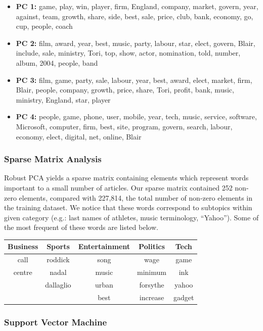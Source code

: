 \documentclass[12pt]{article}
\begin{document}
\begin{itemize}
\item {\bf PC 1:} game, play, win, player, firm, England, company, market, govern, year, against, team, growth, share, side, best, sale, price, club, bank, economy, go, cup, people, coach
\item {\bf PC 2:} film, award, year, best, music, party, labour, star, elect, govern, Blair, include, sale, ministry, Tori, top, show, actor, nomination, told, number, album, 2004, people, band
\item {\bf PC 3:}  film, game, party, sale, labour, year, best, award, elect, market, firm, Blair, people, company, growth, price, share, Tori, profit, bank, music, ministry, England, star, player
\item {\bf PC 4:} people, game, phone, user, mobile, year, tech, music, service, software, Microsoft, computer, firm, best, site, program, govern, search, labour, economy, elect, digital,
net, online, Blair
\end{itemize}

\subsubsection{Sparse Matrix Analysis}
Robust PCA yields a sparse matrix containing elements which represent words important to a small number of articles. Our sparse matrix contained 252 non-zero elements, compared with 227,814, the total number of non-zero elements in the training dataset. We notice that these words correspond to subtopics within given category (e.g.: last names of athletes, music terminology, “Yahoo”). Some of the most frequent of these words are listed below.

\begin{center}
\begin{tabular}{c c c c c}
{\bf Business} & {\bf Sports} & {\bf Entertainment} & {\bf Politics} & {\bf Tech} \\ \hline
call & roddick & song & wage & game \\
centre & nadal & music & minimum & ink \\
 & dallaglio & urban & forsythe & yahoo \\
 & & best & increase & gadget \\
\end{tabular}
\end{center}



\subsubsection{Support Vector Machine}
\end{document}
